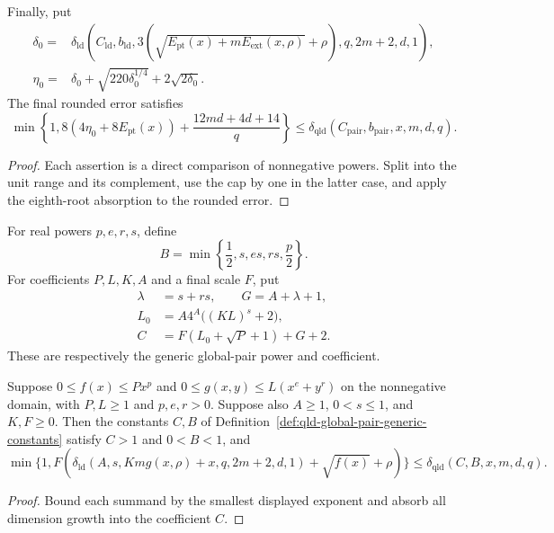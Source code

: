 \begin{theorem}
Finally, put
\[
\begin{split}
 \delta_0={}&\delta_{\mathrm{ld}}\left(C_{\mathrm{ld}},b_{\mathrm{ld}},
  3\left(\sqrt{E_{\mathrm{pt}}(x)+mE_{\mathrm{ext}}(x,\rho)}+\rho\right),
  q,2m+2,d,1\right),\\
 \eta_0={}&\delta_0+\sqrt{220\delta_0^{1/4}}+2\sqrt{2\delta_0}.
\end{split}
\]
The final rounded error satisfies
\[
 \min\left\{1,8(4\eta_0+8E_{\mathrm{pt}}(x))
   +\frac{12md+4d+14}{q}\right\}
 \leq\delta_{\mathrm{qld}}(C_{\mathrm{pair}},b_{\mathrm{pair}},x,m,d,q).
\]
\end{theorem}
\begin{proof}
\leanok
Each assertion is a direct comparison of nonnegative powers.  Split into the
unit range and its complement, use the cap by one in the latter case, and
apply the eighth-root absorption to the rounded error.
\end{proof}

\begin{definition}
\label{def:qld-global-pair-generic-constants}
\leanok
For real powers $p,e,r,s$, define
\[
 B=\min\left\{\frac12,s,es,rs,\frac p2\right\}.
\]
For coefficients $P,L,K,A$ and a final scale $F$, put
\[
 \begin{split}
 \lambda&=s+rs,\qquad G=A+\lambda+1,\\
 L_0&=A4^A\bigl((KL)^s+2\bigr),\\
 C&=F(L_0+\sqrt P+1)+G+2.
 \end{split}
\]
These are respectively the generic global-pair power and coefficient.
\end{definition}

\begin{theorem}
\label{thm:qld-global-pair-bound-explicit}
\leanok
{}
Suppose $0\leq f(x)\leq Px^p$ and
$0\leq g(x,y)\leq L(x^e+y^r)$ on the nonnegative domain, with $P,L\geq1$
and $p,e,r>0$.  Suppose also $A\geq1$, $0<s\leq1$, and $K,F\geq0$.
Then the constants $C,B$ of
Definition~\ref{def:qld-global-pair-generic-constants} satisfy
$C>1$ and $0<B<1$, and
\[
 \min\{1,F(\delta_{\mathrm{ld}}(A,s,Km g(x,\rho)+x,q,2m+2,d,1)
   +\sqrt{f(x)}+\rho)\}
 \leq\delta_{\mathrm{qld}}(C,B,x,m,d,q).
\]
\end{theorem}
\begin{proof}
\leanok
Bound each summand by the smallest displayed exponent and absorb all
dimension growth into the coefficient $C$.
\end{proof}

